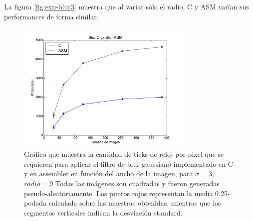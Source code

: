 La figura \ref{fig:exp-blur3} muestra que al variar sólo el radio, C y ASM varían sus performances de forma similar.

\begin{figure}[H]
 	\centering
 	\includegraphics[width=0.75\textwidth]{../graficos/blur_v1_lineplot.pdf}
	\caption{\footnotesize Gráfico que muestra la cantidad de ticks de reloj por pixel que se requieren para aplicar el filtro de blur gaussiano implementado en C y en assembler en función del ancho de la imagen, para $\sigma = 3$, $radio = 9$ Todas las imágenes son cuadradas y fueron generadas pseudo-aleatoriamente. Los puntos rojos representan la media 0.25-podada calculada sobre las muestras obtenidas, mientras que los segmentos verticales indican la desviación standard.}
	\label{fig:exp-blur4}
\end{figure}

